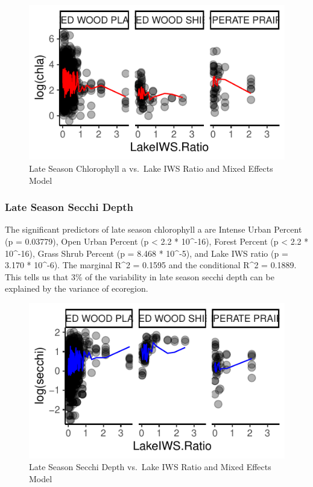 \documentclass[12pt,]{article}
\begin{document}
\begin{figure}
\centering
\includegraphics{Bollt_Greif_Raby_Roth_Project_Final_files/figure-latex/unnamed-chunk-21-1.pdf}
\caption{Late Season Chlorophyll a vs.~Lake IWS Ratio and Mixed Effects
Model}
\end{figure}

\hypertarget{late-season-secchi-depth}{%
\subsubsection{Late Season Secchi
Depth}\label{late-season-secchi-depth}}

The significant predictors of late season chlorophyll a are Intense
Urban Percent (p = 0.03779), Open Urban Percent (p \textless{} 2.2 *
10\^{}-16), Forest Percent (p \textless{} 2.2 * 10\^{}-16), Grass Shrub
Percent (p = 8.468 * 10\^{}-5), and Lake IWS ratio (p = 3.170 *
10\^{}-6). The marginal R\^{}2 = 0.1595 and the conditional R\^{}2 =
0.1889. This tells us that 3\% of the variability in late season secchi
depth can be explained by the variance of ecoregion.

\begin{figure}
\centering
\includegraphics{Bollt_Greif_Raby_Roth_Project_Final_files/figure-latex/unnamed-chunk-22-1.pdf}
\caption{Late Season Secchi Depth vs.~Lake IWS Ratio and Mixed Effects
Model}
\end{figure}
\end{document}
